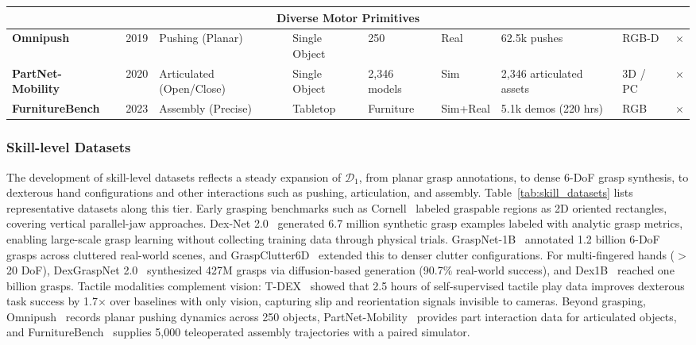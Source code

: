 \documentclass[acmsmall,screen,review]{acmart}
\begin{document}
\begin{table}[t]
{\begin{tabular}{l l l l l l l l l}
\midrule
\multicolumn{9}{c}{\textbf{Diverse Motor Primitives}} \\
\midrule
\textbf{Omnipush}~\cite{bauza2021omnipush} & 2019 & Pushing (Planar) & Single Object & 250 & Real & 62.5k pushes & RGB-D & $\times$ \\
\textbf{PartNet-Mobility}~\cite{xiang2020sapien} & 2020 & Articulated (Open/Close) & Single Object & 2,346 models & Sim & 2,346 articulated assets & 3D / PC & $\times$ \\
\textbf{FurnitureBench}~\cite{heo2023furniturebench} & 2023 & Assembly (Precise) & Tabletop & Furniture & Sim+Real & 5.1k demos (220 hrs) & RGB & $\times$ \\
\bottomrule
\end{tabular}
}
\end{table}

\subsubsection{Skill-level Datasets}\label{sec:skill_datasets_narrative}

The development of skill-level datasets reflects a steady expansion of \(\mathcal{D}_1\), from planar grasp annotations, to dense 6-DoF grasp synthesis, to dexterous hand configurations and other interactions such as pushing, articulation, and assembly. 
Table~\ref{tab:skill_datasets} lists representative datasets along this tier.
Early grasping benchmarks such as Cornell~\cite{lenz2014deep} labeled graspable regions as 2D oriented rectangles, covering vertical parallel-jaw approaches.
Dex-Net 2.0~\cite{mahler2017dex} generated 6.7 million synthetic grasp examples labeled with analytic grasp metrics, enabling large-scale grasp learning without collecting training data through physical trials.
GraspNet-1B~\cite{fang2020graspnet} annotated 1.2 billion 6-DoF grasps across cluttered real-world scenes, and GraspClutter6D~\cite{back2025graspclutter6d} extended this to denser clutter configurations.
For multi-fingered hands ($>$20 DoF), DexGraspNet 2.0~\cite{zhang2024dexgraspnet20learninggenerative} synthesized 427M grasps via diffusion-based generation (90.7\% real-world success), and Dex1B~\cite{ye2025dex1b} reached one billion grasps.
Tactile modalities complement vision: T-DEX~\cite{guzey2023tdex} showed that 2.5 hours of self-supervised tactile play data improves dexterous task success by 1.7$\times$ over baselines with only vision, capturing slip and reorientation signals invisible to cameras.
Beyond grasping, Omnipush~\cite{bauza2021omnipush} records planar pushing dynamics across 250 objects, PartNet-Mobility~\cite{xiang2020sapien} provides part interaction data for articulated objects, and FurnitureBench~\cite{heo2023furniturebench} supplies 5,000 teleoperated assembly trajectories with a paired simulator.
\end{document}
